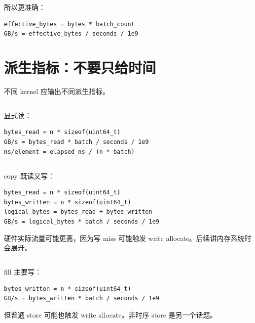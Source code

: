 所以更准确：

\begin{lstlisting}
effective_bytes = bytes * batch_count
GB/s = effective_bytes / seconds / 1e9
\end{lstlisting}

\section{派生指标：不要只给时间}

不同 kernel 应输出不同派生指标。

\subsection{}

显式读：

\begin{lstlisting}
bytes_read = n * sizeof(uint64_t)
GB/s = bytes_read * batch / seconds / 1e9
ns/element = elapsed_ns / (n * batch)
\end{lstlisting}

\subsection{}

copy 既读又写：

\begin{lstlisting}
bytes_read = n * sizeof(uint64_t)
bytes_written = n * sizeof(uint64_t)
logical_bytes = bytes_read + bytes_written
GB/s = logical_bytes * batch / seconds / 1e9
\end{lstlisting}

硬件实际流量可能更高，因为写 miss 可能触发 write allocate。后续讲内存系统时会展开。

\subsection{}

fill 主要写：

\begin{lstlisting}
bytes_written = n * sizeof(uint64_t)
GB/s = bytes_written * batch / seconds / 1e9
\end{lstlisting}

但普通 store 可能也触发 write allocate。非时序 store 是另一个话题。

\subsection{}

